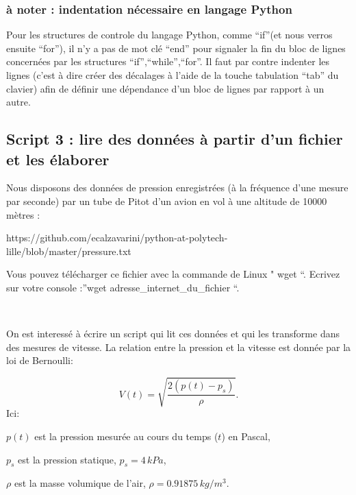 \documentclass{article}
\begin{document}
    \subsubsection{à noter : indentation nécessaire en langage
Python}\label{uxe0-noter-indentation-nuxe9cessaire-en-langage-python}

    Pour les structures de controle du langage Python, comme ``if''(et nous
verros ensuite ``for''), il n'y a pas de mot clé ``end'' pour signaler
la fin du bloc de lignes concernées par les structures
``if'',``while'',``for''. Il faut par contre indenter les lignes (c'est
à dire créer des décalages à l'aide de la touche tabulation ``tab'' du
clavier) afin de définir une dépendance d'un bloc de lignes par rapport
à un autre.

    \subsection{Script 3 : lire des données à partir d'un fichier et les
élaborer}\label{script-3-lire-des-donnuxe9es-uxe0-partir-dun-fichier-et-les-uxe9laborer}

    Nous disposons des données de pression enregistrées (à la fréquence
d'une mesure par seconde) par un tube de Pitot d'un avion en vol à une
altitude de 10000 mètres :

https://github.com/ecalzavarini/python-at-polytech-lille/blob/master/pressure.txt

Vous pouvez télécharger ce fichier avec la commande de Linux " wget ``.
Ecrivez sur votre console :''wget adresse\_internet\_du\_fichier ``.

    \begin{center}
    \end{center}
    { \hspace*{\fill} \\}
    

    On est interessé à écrire un script qui lit ces données et qui les
transforme dans des mesures de vitesse. La relation entre la pression et
la vitesse est donnée par la loi de Bernoulli:

    \[V(t) = \sqrt{\frac{2\left(p(t)-p_s\right)}{\rho}}.\] Ici:

\(p(t)\) est la pression mesurée au cours du temps (\(t\)) en Pascal,

\(p_s\) est la pression statique, \(p_s=4 \, kPa\),

\(\rho\) est la masse volumique de l'air, \(\rho=0.91875 \, kg/m^3\).
\end{document}
